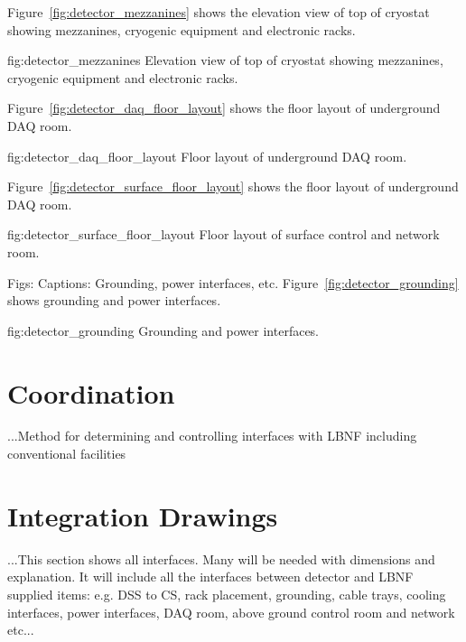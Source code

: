Figure~\ref{fig:detector_mezzanines} shows the elevation view of top
of cryostat showing mezzanines, cryogenic equipment and electronic
racks.
\begin{dunefigure}{fig:detector_mezzanines}
  {Elevation view of top of cryostat showing mezzanines, cryogenic
    equipment and electronic racks.}
\end{dunefigure}

Figure~\ref{fig:detector_daq_floor_layout} shows the floor layout of underground DAQ room.
\begin{dunefigure}{fig:detector_daq_floor_layout}
  {Floor layout of underground DAQ room.}
\end{dunefigure}

Figure~\ref{fig:detector_surface_floor_layout} shows the floor layout
of underground DAQ room.
\begin{dunefigure}{fig:detector_surface_floor_layout} {Floor layout of surface control and network room.}
\end{dunefigure}

Figs:
Captions: Grounding, power interfaces, etc. 
Figure~\ref{fig:detector_grounding} shows grounding and power interfaces.
\begin{dunefigure}{fig:detector_grounding} {Grounding and power interfaces.}
\end{dunefigure}

\section{Coordination}

...Method for determining and controlling interfaces with LBNF including conventional facilities

\section{Integration Drawings}

...This section shows all interfaces. Many will be needed with
dimensions and explanation. It will include all the interfaces between
detector and LBNF supplied items: e.g. DSS to CS, rack placement,
grounding, cable trays, cooling interfaces, power interfaces, DAQ
room, above ground control room and network etc...
